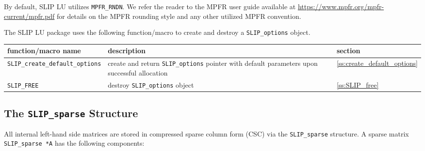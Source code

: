 \documentclass[11pt]{article}
\theoremstyle{definition}
\begin{document}
\begin{itemize}
\noindent By default, SLIP LU utilizes \verb|MPFR_RNDN|. We refer the reader to
the MPFR user guide available at
\url{https://www.mpfr.org/mpfr-current/mpfr.pdf} for details on the MPFR
rounding style and any other utilized MPFR convention.

\end{itemize}

The SLIP LU package uses the following function/macro to create and destroy a
\verb|SLIP_options| object.

\begin{center}
\begin{tabular}{lp{3in}l}
\hline
function/macro name & description & section \\
\hline
\verb|SLIP_create_default_options|
    & create and return \verb|SLIP_options| pointer
      with default parameters upon successful allocation
    & \ref{ss:create_default_options} \\
\hline
\verb|SLIP_FREE|
    & destroy \verb|SLIP_options| object
    & \ref{ss:SLIP_free} \\
\hline
\end{tabular}
\end{center}

\cprotect\subsection{The \verb|SLIP_sparse| Structure}\label{ss:SLIP_sparse}

All internal left-hand side matrices are stored in compressed sparse column
form (CSC) via the \verb|SLIP_sparse| structure. A sparse matrix
\verb|SLIP_sparse *A| has the following components:
\end{document}
